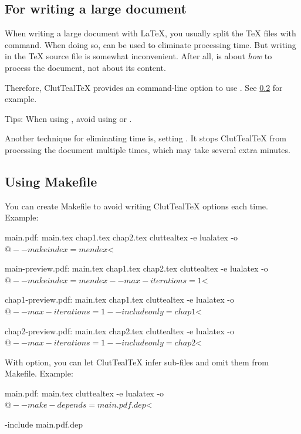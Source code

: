\documentclass[a4paper, 11pt]{scrartcl}
\let\TeXold\TeX
\newcommand\CluttealTeX{ClutTeal\TeX\xspace}
\renewcommand\TeX{\TeXold\xspace}
\begin{document}
\subsection{For writing a large document}
When writing a large document with \LaTeX, you usually split the \TeX files with  command.
When doing so,  can be used to eliminate processing time.
But writing  in the \TeX source file is somewhat inconvenient.
After all,  is about \emph{how} to process the document, not about its content.

Therefore, \CluttealTeX provides an command-line option to use .
See \cref{sec:makefile-example} for example.

Tips: When using , avoid using  or .

Another technique for eliminating time is, setting .
It stops \CluttealTeX from processing the document multiple times, which may take several extra minutes.

\subsection{Using Makefile}\label{sec:makefile-example}
You can create Makefile to avoid writing \CluttealTeX options each time.
Example:
\begin{boxcodemake}
main.pdf: main.tex chap1.tex chap2.tex
    cluttealtex -e lualatex -o $@ --makeindex=mendex $<

main-preview.pdf: main.tex chap1.tex chap2.tex
    cluttealtex -e lualatex -o $@ --makeindex=mendex --max-iterations=1 $<

chap1-preview.pdf: main.tex chap1.tex
    cluttealtex -e lualatex -o $@ --max-iterations=1 --includeonly=chap1 $<

chap2-preview.pdf: main.tex chap2.tex
    cluttealtex -e lualatex -o $@ --max-iterations=1 --includeonly=chap2 $<
\end{boxcodemake}

With  option, you can let \CluttealTeX infer sub-files and omit them from Makefile.
Example:

\begin{boxcodemake}
main.pdf: main.tex
    cluttealtex -e lualatex -o $@ --make-depends=main.pdf.dep $<

-include main.pdf.dep
\end{boxcodemake}
\end{document}
